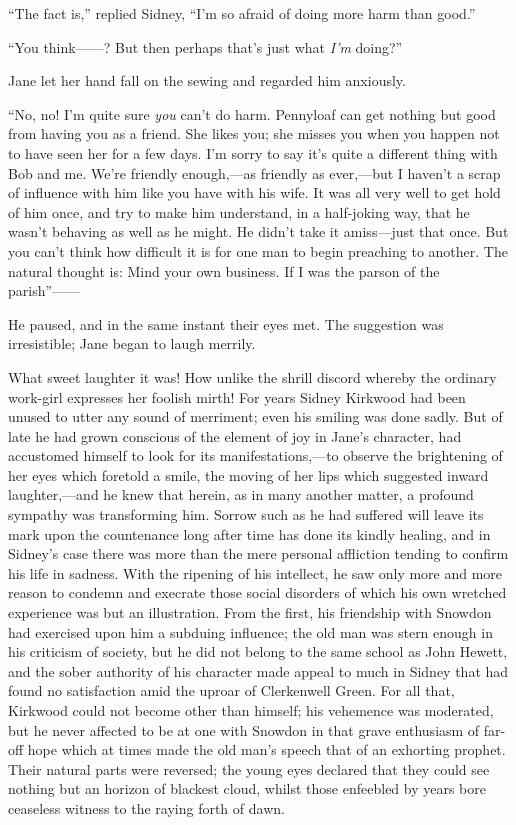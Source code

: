 ``The fact is,'' replied Sidney, ``I'm so afraid of doing more harm than
good.''

``You think{{------}}? But then perhaps that's just what \emph{I'm}
doing?''

Jane let her hand fall on the sewing and regarded him anxiously.

``No, no! I'm quite sure \emph{you} can't do harm. Pennyloaf can get
nothing but good from having you as a friend. She likes you; she misses
you when you happen not to have {}seen her for a few days. I'm sorry to
say it's quite a different thing with Bob and me. We're friendly
enough,---as friendly as ever,---but I haven't a scrap of influence with
him like you have with his wife. It was all very well to get hold of him
once, and try to make him understand, in a half-joking way, that he
wasn't behaving as well as he might. He didn't take it amiss---just that
once. But you can't think how difficult it is for one man to begin
preaching to another. The natural thought is: Mind your own business. If
I was the parson of the parish''{{------}}

He paused, and in the same instant their eyes met. The suggestion was
irresistible; Jane began to laugh merrily.

What sweet laughter it was! How unlike the shrill discord whereby the
ordinary work-girl expresses her foolish mirth! For years Sidney
Kirkwood had been unused to utter any sound of merriment; even his
smiling was done sadly. But of late he had grown conscious of the
element of joy in Jane's character, had accustomed himself to look for
{}its manifestations,---to observe the brightening of her eyes which
foretold a smile, the moving of her lips which suggested inward
laughter,---and he knew that herein, as in many another matter, a
profound sympathy was transforming him. Sorrow such as he had suffered
will leave its mark upon the countenance long after time has done its
kindly healing, and in Sidney's case there was more than the mere
personal affliction tending to confirm his life in sadness. With the
ripening of his intellect, he saw only more and more reason to condemn
and execrate those social disorders of which his own wretched experience
was but an illustration. From the first, his friendship with Snowdon had
exercised upon him a subduing influence; the old man was stern enough in
his criticism of society, but he did not belong to the same school as
John Hewett, and the sober authority of his character made appeal to
much in Sidney that had found no satisfaction amid the uproar of
Clerkenwell Green. For all that, Kirkwood could not become other than
himself; his vehemence was {}moderated, but he never affected to be at
one with Snowdon in that grave enthusiasm of far-off hope which at times
made the old man's speech that of an exhorting prophet. Their natural
parts were reversed; the young eyes declared that they could see nothing
but an horizon of blackest cloud, whilst those enfeebled by years bore
ceaseless witness to the raying forth of dawn.

